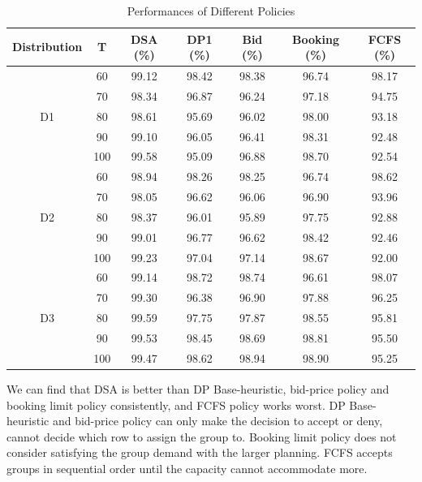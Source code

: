 \begin{table}[ht]
  \centering
  \caption{Performances of Different Policies}
  \begin{tabular}{|c|c|c|c|c|c|c|}
  \hline
  Distribution & T & DSA (\%) & DP1 (\%) & Bid (\%) & Booking (\%) & FCFS (\%) \\
  \hline
  \multirow{5}{*}{D1} & 60   & 99.12 & 98.42 & 98.38 & 96.74 & 98.17 \\
  & 70    & 98.34 & 96.87 & 96.24 & 97.18 & 94.75 \\
  & 80    & 98.61 & 95.69 & 96.02 & 98.00 & 93.18 \\
  & 90    & 99.10 & 96.05 & 96.41 & 98.31 & 92.48 \\
  & 100   & 99.58 & 95.09 & 96.88 & 98.70 & 92.54 \\
  \hline
  \multirow{5}{*}{D2} & 60   & 98.94 & 98.26 & 98.25 & 96.74 & 98.62 \\
     & 70   & 98.05 & 96.62 & 96.06 & 96.90 & 93.96 \\
     & 80   & 98.37 & 96.01 & 95.89 & 97.75 & 92.88 \\
     & 90   & 99.01 & 96.77 & 96.62 & 98.42 & 92.46 \\
     & 100  & 99.23 & 97.04 & 97.14 & 98.67 & 92.00 \\
  \hline
  \multirow{5}{*}{D3} & 60  &  99.14 & 98.72 & 98.74 & 96.61 & 98.07 \\
     & 70  & 99.30 & 96.38 & 96.90 & 97.88 & 96.25 \\
     & 80  & 99.59 & 97.75 & 97.87 & 98.55 & 95.81 \\
     & 90  & 99.53 & 98.45 & 98.69 & 98.81 & 95.50 \\
     & 100 & 99.47 & 98.62 & 98.94 & 98.90 & 95.25 \\
  \hline
  \end{tabular}
\end{table}

We can find that DSA is better than DP Base-heuristic, bid-price policy and booking limit policy consistently, and FCFS policy works worst. DP Base-heuristic and bid-price policy can only make the decision to accept or deny, cannot decide which row to assign the group to. Booking limit policy does not consider satisfying the group demand with the larger planning. FCFS accepts groups in sequential order until the capacity cannot accommodate more.

